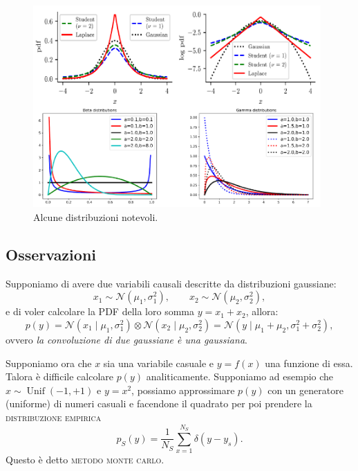 \documentclass[10pt]{article}
\DeclareMathOperator{\Unif}{Unif}
\newcommand{\im}[1]{\textsc{#1}}
\newcommand{\cond}{\mid}
\newcommand{\pare}[1]{
	\ensuremath{\left(#1\right)}
}
\theoremstyle{definition}
\begin{document}
\begin{figure}
\includegraphics[width=0.98\textwidth]{Images/distributions.PNG}
\caption{Alcune distribuzioni notevoli.}\label{fig:distributions}
\end{figure}

\subsection{Osservazioni}
Supponiamo di avere due variabili causali descritte da distribuzioni gaussiane:
\begin{equation}
x_1 \sim \mathcal{N}\pare{\mu_1, \sigma_1^2},\qquad x_2 \sim \mathcal{N}\pare{\mu_2, \sigma_2^2},
\end{equation}
e di voler calcolare la PDF della loro somma $y = x_1 + x_2$, allora:
\begin{equation}
p\pare{y} = \mathcal{N}\pare{x_1\cond\mu_1, \sigma^2_1} \otimes \mathcal{N}\pare{x_2\cond\mu_2, \sigma^2_2} = \mathcal{N}\pare{y\cond\mu_1 + \mu_2, \sigma^2_1 + \sigma^2_2},
\end{equation}
ovvero \textit{la convoluzione di due gaussiane è una gaussiana}.

Supponiamo ora che $x$ sia una variabile casuale e $y = f\pare{x}$ una funzione
di essa. Talora è difficile calcolare $p\pare{y}$ analiticamente. Supponiamo ad
esempio che $x\sim\Unif\pare{-1,+1}$ e $y=x^2$, possiamo approssimare
$p\pare{y}$ con un generatore (uniforme) di numeri casuali e facendone il
quadrato per poi prendere la \im{distribuzione empirica}
\begin{equation}
p_S\pare{y} = \frac{1}{N_S}\sum_{x=1}^{N_S}\delta\pare{y-y_s}.
\end{equation}
Questo è detto \im{metodo monte carlo}.
\end{document}
